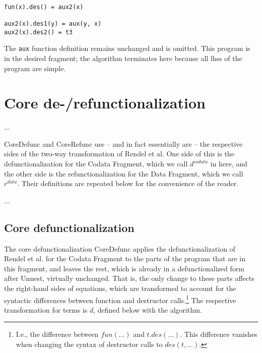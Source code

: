 \begin{lstlisting}

fun(x).des() = aux2(x)

aux2(x).des1(y) = aux(y, x)
aux2(x).des2() = t3

\end{lstlisting}

The \texttt{aux} function definition remains unchanged and is omitted. This program is in the desired fragment; the algorithm terminates here because all lhss of the program are simple.

\section{Core de-/refunctionalization}

...

\textsf{CoreDefunc} and \textsf{CoreRefunc} use -- and in fact essentially are -- the respective sides of the two-way transformation of Rendel et al. One side of this is the defunctionalization for the Codata Fragment, which we call $d^{codata}$ in here, and the other side is the refunctionalization for the Data Fragment, which we call $r^{data}$. Their definitions are repeated below for the convenience of the reader.

...

\subsection{Core defunctionalization}

The core defunctionalization \textsf{CoreDefunc} applies the defunctionalization of Rendel et al. for the Codata Fragment to the parts of the program that are in this fragment, and leaves the rest, which is already in a defunctionalized form after \textsf{Unnest}, virtually unchanged. That is, the only change to these parts affects the right-hand sides of equations, which are transformed to account for the syntactic differences between function and destructor calls.\footnote{I.e., the difference between $fun(...)$ and $t.des(...)$. This difference vanishes when changing the syntax of destructor calls to $des(t, ...)$.} The respective transformation for terms is $d$, defined below with the algorithm.


